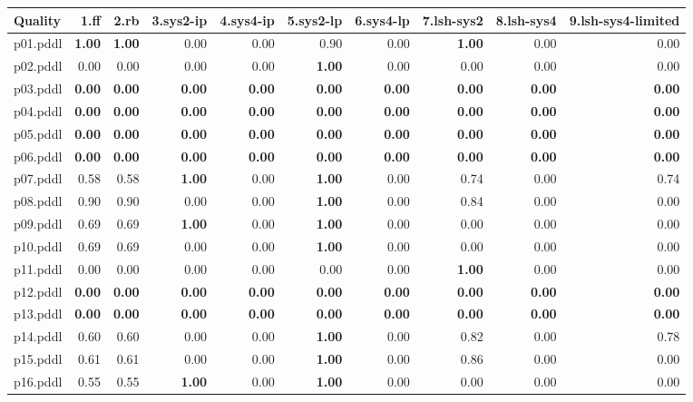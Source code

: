 \documentclass{article}
\begin{document}
\begin{tabular}{@{}lrrrrrrrrr@{}}
Quality & 1.ff & 2.rb & 3.sys2-ip & 4.sys4-ip & 5.sys2-lp & 6.sys4-lp & 7.lsh-sys2 & 8.lsh-sys4 & 9.lsh-sys4-limited \\
\midrule
p01.pddl & \textbf{1.00} & \textbf{1.00} & 0.00 & 0.00 & 0.90 & 0.00 & \textbf{1.00} & 0.00 & 0.00 \\
p02.pddl & 0.00 & 0.00 & 0.00 & 0.00 & \textbf{1.00} & 0.00 & 0.00 & 0.00 & 0.00 \\
p03.pddl & \textbf{0.00} & \textbf{0.00} & \textbf{0.00} & \textbf{0.00} & \textbf{0.00} & \textbf{0.00} & \textbf{0.00} & \textbf{0.00} & \textbf{0.00} \\
p04.pddl & \textbf{0.00} & \textbf{0.00} & \textbf{0.00} & \textbf{0.00} & \textbf{0.00} & \textbf{0.00} & \textbf{0.00} & \textbf{0.00} & \textbf{0.00} \\
p05.pddl & \textbf{0.00} & \textbf{0.00} & \textbf{0.00} & \textbf{0.00} & \textbf{0.00} & \textbf{0.00} & \textbf{0.00} & \textbf{0.00} & \textbf{0.00} \\
p06.pddl & \textbf{0.00} & \textbf{0.00} & \textbf{0.00} & \textbf{0.00} & \textbf{0.00} & \textbf{0.00} & \textbf{0.00} & \textbf{0.00} & \textbf{0.00} \\
p07.pddl & 0.58 & 0.58 & \textbf{1.00} & 0.00 & \textbf{1.00} & 0.00 & 0.74 & 0.00 & 0.74 \\
p08.pddl & 0.90 & 0.90 & 0.00 & 0.00 & \textbf{1.00} & 0.00 & 0.84 & 0.00 & 0.00 \\
p09.pddl & 0.69 & 0.69 & \textbf{1.00} & 0.00 & \textbf{1.00} & 0.00 & 0.00 & 0.00 & 0.00 \\
p10.pddl & 0.69 & 0.69 & 0.00 & 0.00 & \textbf{1.00} & 0.00 & 0.00 & 0.00 & 0.00 \\
p11.pddl & 0.00 & 0.00 & 0.00 & 0.00 & 0.00 & 0.00 & \textbf{1.00} & 0.00 & 0.00 \\
p12.pddl & \textbf{0.00} & \textbf{0.00} & \textbf{0.00} & \textbf{0.00} & \textbf{0.00} & \textbf{0.00} & \textbf{0.00} & \textbf{0.00} & \textbf{0.00} \\
p13.pddl & \textbf{0.00} & \textbf{0.00} & \textbf{0.00} & \textbf{0.00} & \textbf{0.00} & \textbf{0.00} & \textbf{0.00} & \textbf{0.00} & \textbf{0.00} \\
p14.pddl & 0.60 & 0.60 & 0.00 & 0.00 & \textbf{1.00} & 0.00 & 0.82 & 0.00 & 0.78 \\
p15.pddl & 0.61 & 0.61 & 0.00 & 0.00 & \textbf{1.00} & 0.00 & 0.86 & 0.00 & 0.00 \\
p16.pddl & 0.55 & 0.55 & \textbf{1.00} & 0.00 & \textbf{1.00} & 0.00 & 0.00 & 0.00 & 0.00 \\

\end{tabular}
\end{document}

